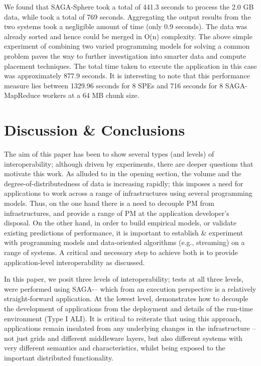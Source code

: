 \documentclass[3p,twocolumn]{elsarticle}
\begin{document}
We found that SAGA-Sphere took a total of 441.3 seconds to 
process the 2.0 GB data, while \sagamapreduce took a total of 
769 seconds. Aggregating the output results from the two systems 
took a negligible amount of time (only 0.9 seconds). The data was 
already sorted and hence could be merged in O(n) complexity. 
The above simple experiment of combining two varied programming 
models for solving a common problem paves the way to further 
investigation into smarter data and compute placement techniques. 
The total time taken to execute the \wc application in this 
case was approximately 877.9 seconds. It is interesting to 
note that this performance measure lies between 1329.96 seconds 
for 8 SPEs and 716 seconds for 8 SAGA-MapReduce workers at 
a 64 MB chunk size. 



\section{Discussion \& Conclusions}
\label{sec:discuss}

The aim of this paper has been to show several types (and levels) of
interoperability; although driven by experiments, there are deeper
questions that motivate this work.  As alluded to in the opening
section, the volume and the degree-of-distributedness of data is
increasing rapidly; this imposes a need for applications to work
across a range of infrastructures using several programming models.
Thus, on the one hand there is a need to decouple PM from
infrastructures, and provide a range of PM at the application
developer's disposal. On the other hand, in order to build empirical
models, or validate existing predictions of performance, it is
important to establish \& experiment with programming models and
data-oriented algorithms (e.g., streaming) on a range of
systems. %
A critical and necessary step to achieve both is to provide
application-level interoperability as discussed.

In this paper, we posit three levels of interoperability; tests at all
three levels, were performed using SAGA-\mr -- which from an execution
perspective is a relatively straight-forward application.  At the
lowest level, \sagamapreduce demonstrates how to decouple the
development of applications from the deployment and details of the
run-time environment (Type I ALI).  It is critical to reiterate that
using this approach, applications remain insulated from any underlying
changes in the infrastructure -- not just grids and different
middleware layers, but also different systems with very different
semantics and characteristics, whilst being exposed to the important
distributed functionality.
\end{document}
